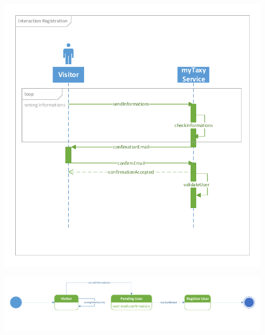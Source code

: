 \begin{center}
	\includegraphics[height=\textwidth]{diagrams/registration}
\end{center}
\begin{center}
	\includegraphics[width=\textwidth]{diagrams/registration_state}
\end{center}

